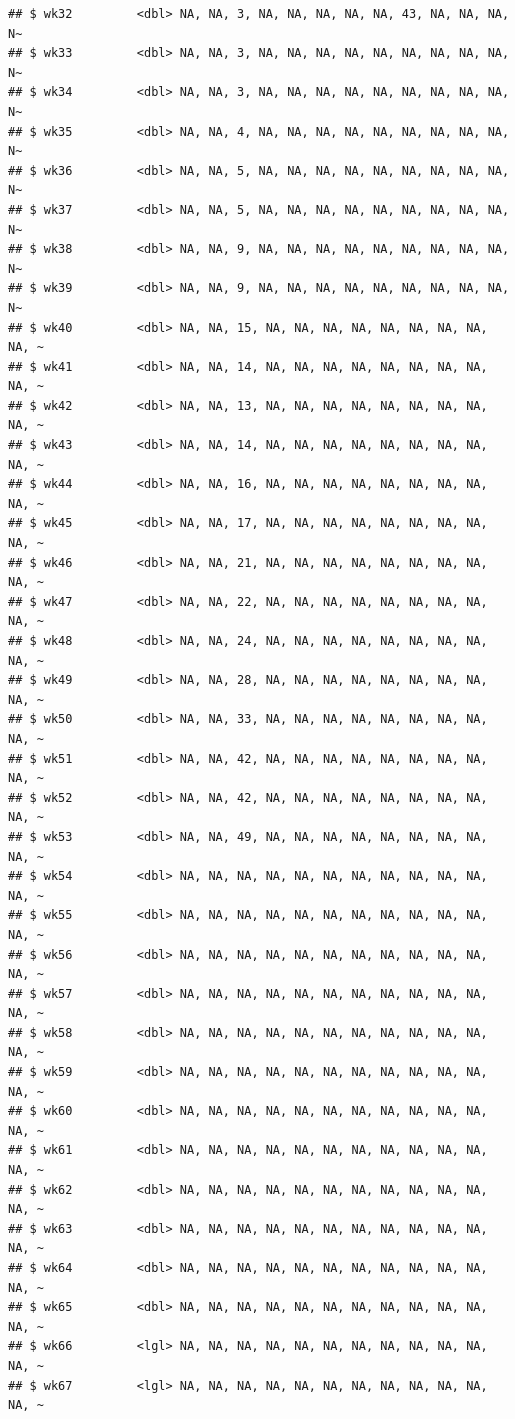 \documentclass[
  11pt]{report}
\begin{document}
\begin{itemize}
\begin{itemize}
\begin{verbatim}
## $ wk32         <dbl> NA, NA, 3, NA, NA, NA, NA, NA, 43, NA, NA, NA, N~
## $ wk33         <dbl> NA, NA, 3, NA, NA, NA, NA, NA, NA, NA, NA, NA, N~
## $ wk34         <dbl> NA, NA, 3, NA, NA, NA, NA, NA, NA, NA, NA, NA, N~
## $ wk35         <dbl> NA, NA, 4, NA, NA, NA, NA, NA, NA, NA, NA, NA, N~
## $ wk36         <dbl> NA, NA, 5, NA, NA, NA, NA, NA, NA, NA, NA, NA, N~
## $ wk37         <dbl> NA, NA, 5, NA, NA, NA, NA, NA, NA, NA, NA, NA, N~
## $ wk38         <dbl> NA, NA, 9, NA, NA, NA, NA, NA, NA, NA, NA, NA, N~
## $ wk39         <dbl> NA, NA, 9, NA, NA, NA, NA, NA, NA, NA, NA, NA, N~
## $ wk40         <dbl> NA, NA, 15, NA, NA, NA, NA, NA, NA, NA, NA, NA, ~
## $ wk41         <dbl> NA, NA, 14, NA, NA, NA, NA, NA, NA, NA, NA, NA, ~
## $ wk42         <dbl> NA, NA, 13, NA, NA, NA, NA, NA, NA, NA, NA, NA, ~
## $ wk43         <dbl> NA, NA, 14, NA, NA, NA, NA, NA, NA, NA, NA, NA, ~
## $ wk44         <dbl> NA, NA, 16, NA, NA, NA, NA, NA, NA, NA, NA, NA, ~
## $ wk45         <dbl> NA, NA, 17, NA, NA, NA, NA, NA, NA, NA, NA, NA, ~
## $ wk46         <dbl> NA, NA, 21, NA, NA, NA, NA, NA, NA, NA, NA, NA, ~
## $ wk47         <dbl> NA, NA, 22, NA, NA, NA, NA, NA, NA, NA, NA, NA, ~
## $ wk48         <dbl> NA, NA, 24, NA, NA, NA, NA, NA, NA, NA, NA, NA, ~
## $ wk49         <dbl> NA, NA, 28, NA, NA, NA, NA, NA, NA, NA, NA, NA, ~
## $ wk50         <dbl> NA, NA, 33, NA, NA, NA, NA, NA, NA, NA, NA, NA, ~
## $ wk51         <dbl> NA, NA, 42, NA, NA, NA, NA, NA, NA, NA, NA, NA, ~
## $ wk52         <dbl> NA, NA, 42, NA, NA, NA, NA, NA, NA, NA, NA, NA, ~
## $ wk53         <dbl> NA, NA, 49, NA, NA, NA, NA, NA, NA, NA, NA, NA, ~
## $ wk54         <dbl> NA, NA, NA, NA, NA, NA, NA, NA, NA, NA, NA, NA, ~
## $ wk55         <dbl> NA, NA, NA, NA, NA, NA, NA, NA, NA, NA, NA, NA, ~
## $ wk56         <dbl> NA, NA, NA, NA, NA, NA, NA, NA, NA, NA, NA, NA, ~
## $ wk57         <dbl> NA, NA, NA, NA, NA, NA, NA, NA, NA, NA, NA, NA, ~
## $ wk58         <dbl> NA, NA, NA, NA, NA, NA, NA, NA, NA, NA, NA, NA, ~
## $ wk59         <dbl> NA, NA, NA, NA, NA, NA, NA, NA, NA, NA, NA, NA, ~
## $ wk60         <dbl> NA, NA, NA, NA, NA, NA, NA, NA, NA, NA, NA, NA, ~
## $ wk61         <dbl> NA, NA, NA, NA, NA, NA, NA, NA, NA, NA, NA, NA, ~
## $ wk62         <dbl> NA, NA, NA, NA, NA, NA, NA, NA, NA, NA, NA, NA, ~
## $ wk63         <dbl> NA, NA, NA, NA, NA, NA, NA, NA, NA, NA, NA, NA, ~
## $ wk64         <dbl> NA, NA, NA, NA, NA, NA, NA, NA, NA, NA, NA, NA, ~
## $ wk65         <dbl> NA, NA, NA, NA, NA, NA, NA, NA, NA, NA, NA, NA, ~
## $ wk66         <lgl> NA, NA, NA, NA, NA, NA, NA, NA, NA, NA, NA, NA, ~
## $ wk67         <lgl> NA, NA, NA, NA, NA, NA, NA, NA, NA, NA, NA, NA, ~

\end{verbatim}
\end{itemize}
\end{itemize}
\end{document}
